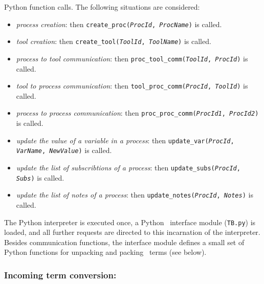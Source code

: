 \begin{itemize}
  Python function calls. The following situations are considered:
  \begin{itemize}
  \item \emph{process creation}: then
    \texttt{create\_proc(\emph{ProcId}, \emph{ProcName})} is
    called.
  \item \emph{tool creation}: then \texttt{create\_tool(\emph{ToolId},
      \emph{ToolName})} is called.
  \item \emph{process to tool communication}: then  
    \texttt{proc\_tool\_comm(\emph{ToolId}, \emph{ProcId})} is
    called.
  \item \emph{tool to process communication}: then  
    \texttt{tool\_proc\_comm(\emph{ProcId}, \emph{ToolId})} is
    called.
  \item \emph{process to process communication}: then  
    \texttt{proc\_proc\_comm(\emph{ProcId1}, \emph{ProcId2})} is
    called.
  \item \emph{update the value of a variable in a process}: then  
    \texttt{update\_var(\emph{ProcId}, \emph{VarName},
      \emph{NewValue})} is called.
  \item \emph{update the list of subscribtions of a process}: then  
    \texttt{update\_subs(\emph{ProcId}, \emph{Subs})} is called.
  \item \emph{update the list of notes of a process}: then  
    \texttt{update\_notes(\emph{ProcId}, \emph{Notes})} is called.
  \end{itemize}
\end{itemize}

\noindent The Python interpreter is executed once, a Python \TB\
interface module (\texttt{TB.py}) is loaded, and all further requests
are directed to this incarnation of the interpreter. Besides
communication functions, the interface module defines a small set
of Python functions for unpacking and packing \TB\ terms (see
below).

\subsubsection{Incoming term conversion:}

